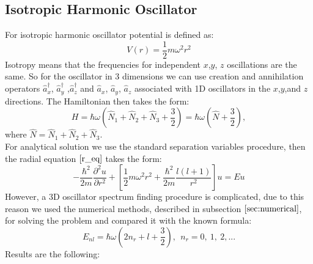 \documentclass[a4paper, 14pt]{article}
\begin{document}
\subsection{Isotropic Harmonic Oscillator}
For isotropic harmonic oscillator potential is defined as:
$$V(r) = \frac{1}{2} m \omega^2 r^2 $$
Isotropy means that the frequencies for independent $x$,$y$, $z$ oscillations are the same. So for the oscillator in 3 dimensions we can use creation and annihilation operators $\hat{a}_x^\dag$, $\hat{a}_y^\dag$ ,$\hat{a}_z^\dag$ and $\hat{a}_x$,  $\hat{a}_y$, $\hat{a}_z$ associated with 1D oscillators in the $x$,$y$,and $z$ directions. The Hamiltonian then takes the form:
$$H = \hbar \omega (\hat{N}_1 + \hat{N}_2 + \hat{N}_3 + \frac{3}{2}) = \hbar \omega (\hat{N} + \frac{3}{2}),$$
where $\hat{N} = \hat{N}_1 + \hat{N}_2 + \hat{N}_3 .$\\
For analytical solution we use the standard separation variables procedure, then the radial equation  $\eqref{r_eq}$ takes the form:
$$-\frac{\hbar^2}{2m}\frac{\partial^2 u}{\partial r^2}+[\frac{1}{2} m \omega^2 r^2+\frac{\hbar^2}{2m}\frac{l(l+1)}{r^2}]u = Eu$$
However, a  3D oscillator spectrum finding procedure is complicated, due to this reason we used the numerical methods, described in subsection  $\ref{sec:numerical}$, for solving the problem and compared it with the known formula:
\begin{equation}
	E_{nl} = \hbar \omega (2 n_r +l+\frac{3}{2}),~~ n_r = 0,~1,~2,...
\end{equation}
Results are the following:
\end{document}
